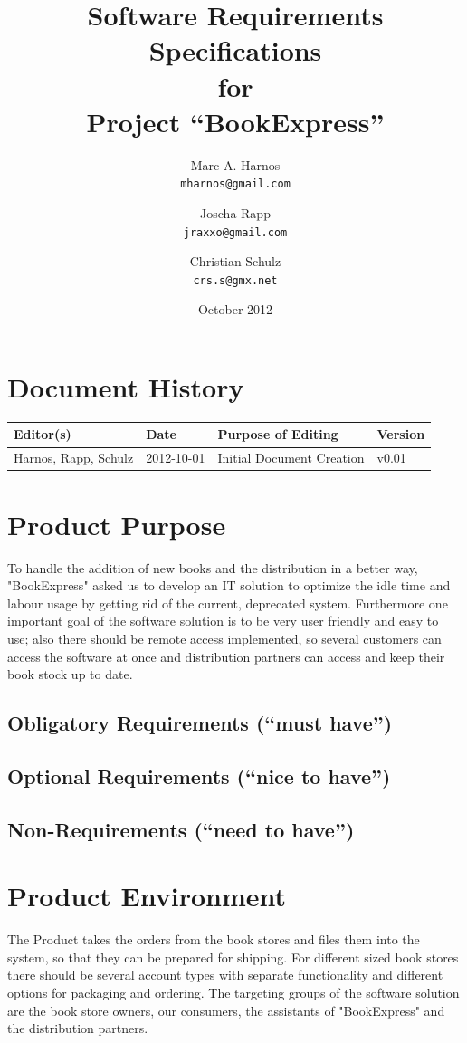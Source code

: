 \documentclass[11pt,a4paper,oneside,svgnames,draft]{report}
\begin{document}
\title{Software Requirements Specifications\\ for\\ Project ``BookExpress''}
\author{Marc A. Harnos\\ \texttt{mharnos@gmail.com} \and Joscha Rapp\\ \texttt{jraxxo@gmail.com} \and Christian Schulz\\ \texttt{crs.s@gmx.net}}
\date{October 2012}
\maketitle
\tableofcontents

\chapter*{Document History}
\begin{tabular}{|l|l|l|l|}
\hline 
Editor(s) & Date & Purpose of Editing & Version \\ 
\hline 
Harnos, Rapp, Schulz & 2012-10-01 & Initial Document Creation & v0.01 \\ 
\hline 
\end{tabular} 

\chapter{Product Purpose}
To handle the addition of new books and the distribution in a better way, "BookExpress" asked us to develop an IT solution to optimize the idle time and labour usage by getting rid of the current, deprecated system. Furthermore one important goal of the software solution is to be very user friendly and easy to use; also there should be remote access implemented, so several customers can access the software at once and distribution partners can access and keep their book stock up to date.
\section{Obligatory Requirements (``must have'')}
\section{Optional Requirements (``nice to have'')}
\section{Non-Requirements (``need to have'')}

\chapter{Product Environment}
The Product takes the orders from the book stores and files them into the system, so that they can be prepared for shipping. For different sized book stores there should be several account types with separate functionality and different options for packaging and ordering. The targeting groups of the software solution are the book store owners, our consumers, the assistants of "BookExpress" and the distribution partners.
\end{document}
